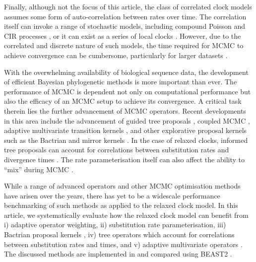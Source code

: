 \documentclass[10pt,letterpaper]{article}
\begin{document}
Finally, although not the focus of this article, the class of correlated clock models assumes some form of auto-correlation between rates over time. 
The correlation itself can invoke a range of stochastic models, including compound Poisson \cite{huelsenbeck2000compound} and CIR processes \cite{lepage2007general}, or it can exist as a series of local clocks \cite{drummond2010bayesian}. 
However, due to the correlated and discrete nature of such models, the time required for MCMC to achieve convergence can be cumbersome, particularly for larger datasets \cite{drummond2010bayesian}.  



With the overwhelming availability of biological sequence data, the development of efficient Bayesian phylogenetic methods is more important than ever. 
The performance of MCMC is dependent not only on computational performance but also the efficacy of an
MCMC setup to achieve its convergence.
A critical task therein lies the further advancement of MCMC operators.
Recent developments in this area include the advancement of guided tree proposals \cite{zhang2020using, meyer2019adaptive, hohna2012guided}, coupled MCMC \cite{altekar2004parallel, muller2019coupled},
adaptive multivariate transition kernels \cite{baele2017adaptive},
and other explorative proposal kernels such as the Bactrian and mirror kernels \cite{yang2013searching, thawornwattana2018designing}.
In the case of relaxed clocks, informed tree proposals can account for correlations between substitution rates and divergence times \cite{zhang2020improving}. 
The rate parameterisation itself can also affect the ability to ``mix'' during MCMC \cite{drummond2006relaxed, li2012model, zhang2020improving}. 




While a range of advanced operators and other MCMC optimisation methods have arisen over the years, there has yet to be a widescale performance benchmarking of such methods as applied to the relaxed clock model. 
In this article, we systematically evaluate how the relaxed clock model can benefit from i) adaptive operator weighting, ii) substitution rate parameterisation,  iii) Bactrian proposal kernels \cite{yang2013searching}, iv) tree operators which account for correlations between substitution rates and times, and v) adaptive multivariate operators \cite{baele2017adaptive}.
The discussed methods are implemented in and compared using BEAST2 \cite{bouckaert2019beast}. 

\end{document}
